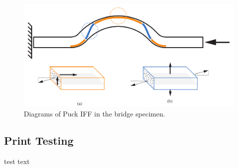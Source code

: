\begin{figure}[t]
\centering
\includegraphics[width=0.8\linewidth]{./figures/fea/puck-failure-qualitative}
\caption{Diagrams of Puck IFF in the bridge specimen.}
\label{fig:puck-failure-qualitative}
\end{figure}

\subsection*{Print Testing}

test text\\